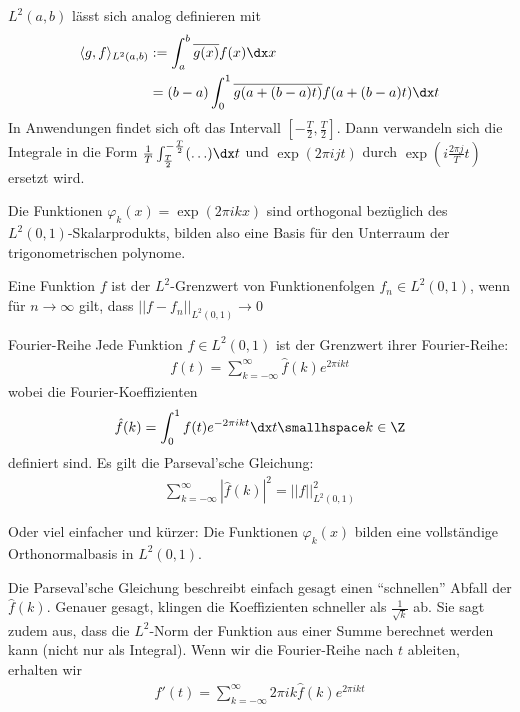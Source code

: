 \inlineremark $L^2(a, b)$ lässt sich analog definieren mit
\rmvspace
\begin{align*}
    \langle g, f \rangle_{L^2(a, b)} & := \int_{a}^{b} \overline{g(x)} f(x) \dx x                              \\
                                     & = (b - a) \int_{0}^{1} \overline{g(a + (b - a)t)} f(a + (b - a)t) \dx t
\end{align*}
In Anwendungen findet sich oft das Intervall $\left[ -\frac{T}{2}, \frac{T}{2} \right]$.
Dann verwandeln sich die Integrale in die Form $\frac{1}{T} \int_{\frac{T}{2}}^{-\frac{T}{2}} (\ldots) \dx t$ und $\exp(2\pi ijt)$ durch $\exp(i \frac{2\pi j}{T} t)$ ersetzt wird.

\inlineremark Die Funktionen $\varphi_k(x) = \exp(2\pi ikx)$ sind orthogonal bezüglich des $L^2(0, 1)$-Skalarprodukts, bilden also eine Basis für den Unterraum der trigonometrischen polynome.


\inlinedef Eine Funktion $f$ ist der $L^2$-Grenzwert von Funktionenfolgen $f_n \in L^2(0, 1)$, wenn für $n \rightarrow \infty$ gilt, dass $||f - f_n||_{L^2(0, 1)} \rightarrow 0$


\begin{theorem}[]{Fourier-Reihe}
    Jede Funktion $f \in L^2(0, 1)$ ist der Grenzwert ihrer Fourier-Reihe:
    \rmvspace
    \begin{align*}
        f(t) = \sum_{k = -\infty}^{\infty} \hat{f}(k) e^{2\pi ikt}
    \end{align*}
    wobei die Fourier-Koeffizienten
    \rmvspace
    \begin{align*}
        \hat{f}(k) = \int_{0}^{1} f(t)e^{-2\pi ikt} \dx t \smallhspace k \in \Z
    \end{align*}
    definiert sind. Es gilt die Parseval'sche Gleichung:
    \rmvspace
    \begin{align*}
        \sum_{k = -\infty}^{\infty} |\hat{f}(k)|^2 = ||f||_{L^2(0, 1)}^2
    \end{align*}
\end{theorem}
\inlineremark Oder viel einfacher und kürzer: Die Funktionen $\varphi_k(x)$ bilden eine vollständige Orthonormalbasis in $L^2(0, 1)$.


\setcounter{all}{14}
\inlineremark Die Parseval'sche Gleichung beschreibt einfach gesagt einen ``schnellen'' Abfall der $\hat{f}(k)$.
Genauer gesagt, klingen die Koeffizienten schneller als $\frac{1}{\sqrt{k}}$ ab.
Sie sagt zudem aus, dass die $L^2$-Norm der Funktion aus einer Summe berechnet werden kann (nicht nur als Integral).
Wenn wir die Fourier-Reihe nach $t$ ableiten, erhalten wir
\rmvspace
\begin{align*}
    f'(t) = \sum_{k = -\infty}^{\infty} 2\pi ik\hat{f}(k)e^{2\pi ikt}
\end{align*}

